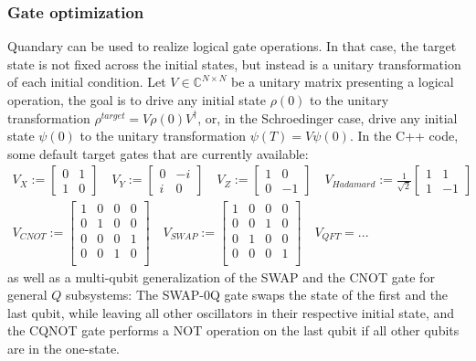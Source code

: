 \documentclass[11pt]{article}
\newcommand{\C}{\mathds{C}}
\begin{document}
\subsubsection{Gate optimization}

Quandary can be used to realize logical gate operations. In that case, the target state is not fixed across the initial states, but instead is a unitary transformation of each initial condition. Let $V\in \C^{N\times N}$ be a unitary matrix presenting a logical operation, the goal is to drive any initial state $\rho(0)$ to the unitary transformation $\rho^{target} = V\rho(0)V^{\dagger}$, or, in the Schroedinger case, drive any initial state $\psi(0)$ to the unitary transformation $\psi(T) =  V\psi(0)$.
In the C++ code, some default target gates that are currently available:
\begin{align}
  V_{X} := \begin{bmatrix} 0 & 1 \\ 1 & 0  \end{bmatrix} \quad
  V_{Y} := \begin{bmatrix} 0 & -i \\ i & 0 \end{bmatrix} \quad
  V_{Z} := \begin{bmatrix} 1 & 0 \\ 0 & -1 \end{bmatrix} \quad 
  V_{Hadamard} := \frac{1}{\sqrt{2}} 
           \begin{bmatrix} 1 & 1 \\ 1 & -1 \end{bmatrix} \\
  V_{CNOT} := \begin{bmatrix} 1  & 0 & 0 & 0 \\ 
                               0  & 1 & 0 & 0 \\ 
                               0  & 0 & 0 & 1 \\ 
                               0  & 0 & 1 & 0 \\ 
                \end{bmatrix} \quad 
  V_{SWAP} := \begin{bmatrix}
    1 & 0 & 0 & 0 \\
    0 & 0 & 1 & 0 \\
    0 & 1 & 0 & 0 \\
    0 & 0 & 0 & 1 \\
  \end{bmatrix} \quad
  V_{QFT} = ...
\end{align}
as well as a multi-qubit generalization of the SWAP and the CNOT gate for general $Q$ subsystems: The SWAP-0Q gate swaps the state of the first and the last qubit, while leaving all other oscillators in their respective initial state, and the CQNOT gate performs a NOT operation on the last qubit if all other qubits are in the one-state.
\end{document}
